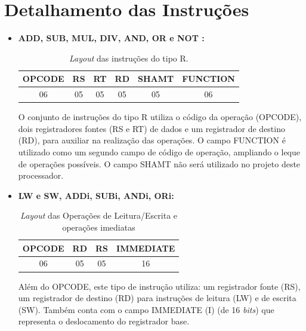 \documentclass{report}
\begin{document}
  \section{Detalhamento das Instruções}
  
  \begin{itemize}
     
     \item \textbf{ADD, SUB, MUL, DIV, AND, OR e NOT :}

  \begin{table}[H]
\centering
	\begin{tabular}{|c|c|c|c|c|c|}
  	\hline 
  	\textbf{OPCODE} & \textbf{RS} & \textbf{RT} & \textbf{RD} & \textbf{SHAMT} & \textbf{FUNCTION} \\ 
  	\hline 
  	06 & 05 & 05 & 05 & 05 & 06 \\ 
  	\hline 
  	\end{tabular} 
  	\caption{\textit{Layout} das instruções do tipo R.}
  \end{table}
  
  O conjunto de instruções do tipo R utiliza o código da operação (OPCODE), dois registradores fontes (RS e RT) de dados e um registrador de destino (RD), para auxiliar na realização das operações. O campo FUNCTION é utilizado como um segundo campo de código de operação, ampliando o leque de operações possíveis. O campo SHAMT não será utilizado no projeto deste processador.\\
  
   \item \textbf{LW e SW, ADDi, SUBi, ANDi, ORi:}

  \begin{table}[H]
\centering
	\begin{tabular}{|c|c|c|c|}
  	\hline 
  	\textbf{OPCODE} & \textbf{RD} & \textbf{RS} & \textbf{IMMEDIATE}  \\ 
  	\hline 
  	06 & 05 & 05 & 16 \\ 
  	\hline 
  	\end{tabular} 
  	\caption{\textit{Layout} das Operações de Leitura/Escrita e operações imediatas}
  \end{table}
  
  Além do OPCODE, este tipo de instrução utiliza: um registrador fonte (RS), um registrador de destino (RD) para instruções de leitura (LW) e de escrita (SW). Também conta com o campo IMMEDIATE (I) (de 16 \textit{bits}) que representa o deslocamento do registrador base.\\
  

\end{itemize}
\end{document}
